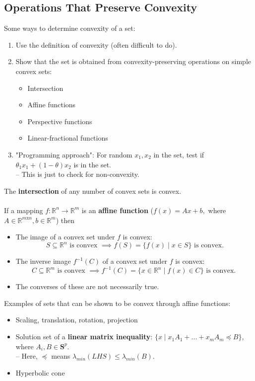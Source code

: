 \documentclass[]{article}
\begin{document}
\subsection*{Operations That Preserve Convexity}
Some ways to determine convexity of a set:
\begin{enumerate}
	\item Use the definition of convexity (often difficult to do).
	\item Show that the set is obtained from convexity-preserving operations on simple convex sets:
	\begin{itemize}
		\item Intersection
		\item Affine functions
		\item Perspective functions
		\item Linear-fractional functions
	\end{itemize}
	\item "Programming approach": For random $x_{1}, x_{2}$ in the set, test if $\theta_{1} x_{1} + (1-\theta) x_{2}$ is in the set. \\
	-- This is just to check for non-convexity. \\
\end{enumerate}
The \textbf{intersection} of any number of convex sets is convex. \\\\
If a mapping $f:\mathbb{R}^{n}\rightarrow\mathbb{R}^{m}$ is an \textbf{affine function} ($f(x)=Ax+b,$ where $ A\in\mathbb{R}^{m \text{x} n}, b\in\mathbb{R}^{m}$) then
\begin{itemize}
	\item The image of a convex set under $f$ is convex: $$S \subseteq \mathbb{R}^{n} \text{ is convex } \implies f(S)=\{f(x)\mid x\in S\} \text{ is convex.}$$
	\item The inverse image $f^{-1}(C)$ of a convex set under $f$ is convex: $$C \subseteq \mathbb{R}^{m} \text{ is convex }\implies f^{-1}(C)=\{x\in\mathbb{R}^{n}\mid f(x)\in C\} \text{ is convex. }$$
	\item The converses of these are not necessarily true. \\
\end{itemize}
Examples of sets that can be shown to be convex through affine functions:
\begin{itemize}
	\item Scaling, translation, rotation, projection
	\item Solution set of a \textbf{linear matrix inequality}: $\{x\mid x_{1}A_{1} + ... + x_{m}A_{m} \preceq B\}$, where $A_{i}, B \in \boldsymbol{S}^{p}$. \\
	-- Here, $\preceq$ means $\lambda_{min}(LHS) \leq \lambda_{min}(B)$.
	\item Hyperbolic cone \\
\end{itemize}
\end{document}
